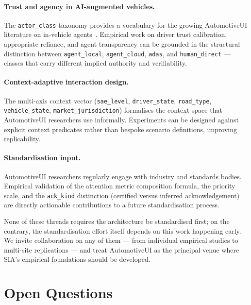 \documentclass[manuscript,screen,review,anonymous]{acmart}
\begin{document}
\paragraph{Trust and agency in AI-augmented vehicles.}
The \texttt{actor\_class} taxonomy provides a vocabulary for the growing
AutomotiveUI literature on in-vehicle agents~\cite{demir2024,gomaa2022}.
Empirical work on driver trust calibration, appropriate reliance, and agent
transparency can be grounded in the structural distinction between
\texttt{agent\_local}, \texttt{agent\_cloud}, \texttt{adas}, and
\texttt{human\_direct} --- classes that carry different implied authority and
verifiability.

\paragraph{Context-adaptive interaction design.}
The multi-axis context vector (\texttt{sae\_level}, \texttt{driver\_state},
\texttt{road\_type}, \texttt{vehicle\_state}, \texttt{market\_jurisdiction})
formalises the context space that AutomotiveUI researchers use informally. Experiments can be designed
against explicit context predicates rather than bespoke scenario definitions,
improving replicability.

\paragraph{Standardisation input.}
AutomotiveUI researchers regularly engage with industry and standards bodies.
Empirical validation of the attention metric composition formula, the priority
scale, and the \texttt{ack\_kind} distinction (certified versus inferred
acknowledgement) are directly actionable contributions to a future
standardisation process.

None of these threads requires the architecture be standardised first; on the
contrary, the standardisation effort itself depends on this work happening
early. We invite collaboration on any of them --- from individual empirical
studies to multi-site replications --- and treat AutomotiveUI as the principal
venue where SIA's empirical foundations should be developed.

\section{Open Questions}
\end{document}
